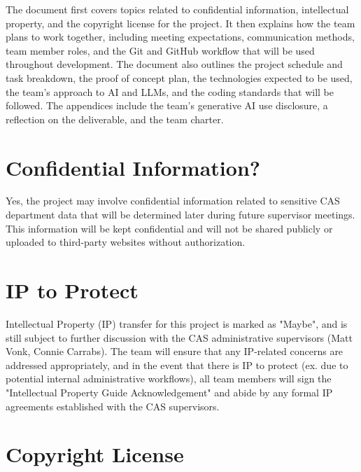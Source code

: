 \documentclass{article}
\begin{document}
\bigskip
The document first covers topics related to confidential information,
intellectual property, and the copyright license for the project. It then
explains how the team plans to work together, including meeting expectations,
communication methods, team member roles, and the Git and GitHub workflow that
will be used throughout development. The document also outlines the project
schedule and task breakdown, the proof of concept plan, the technologies
expected to be used, the team's approach to AI and LLMs, and the coding
standards that will be followed. The appendices include the team's generative AI
use disclosure, a reflection on the deliverable, and the team charter.

\section{Confidential Information?}

Yes, the project may involve confidential information related to sensitive CAS department data that will be determined later during future supervisor meetings. This information will be kept confidential and will not be shared publicly or uploaded to third-party websites without authorization. 

\section{IP to Protect}

Intellectual Property (IP) transfer for this project is marked as "Maybe", and is still subject 
to further discussion with the CAS administrative supervisors (Matt Vonk, Connie Carrabs). 
The team will ensure that any IP-related concerns are addressed appropriately, and in the event 
that there is IP to protect (ex. due to potential internal administrative workflows), all team members 
will sign the "Intellectual Property Guide Acknowledgement" and abide by any formal IP agreements 
established with the CAS supervisors.

\section{Copyright License}
\end{document}
